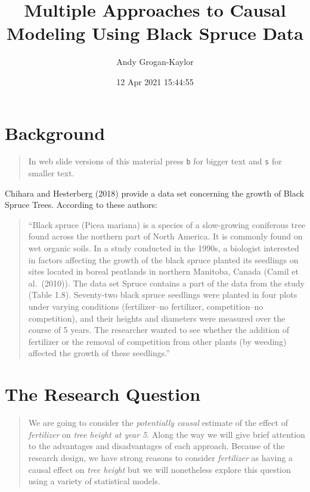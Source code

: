 \documentclass[
]{article}
\title{Multiple Approaches to Causal Modeling Using Black Spruce Data}
\author{Andy Grogan-Kaylor}
\date{12 Apr 2021 15:44:55}
\begin{document}
\maketitle

\hypertarget{background}{%
\section{Background 🌲}\label{background}}

\begin{quote}
In web slide versions of this material press \texttt{b} for bigger text
and \texttt{s} for smaller text.
\end{quote}

Chihara and Hesterberg (2018) provide a data set concerning the growth
of Black Spruce Trees. According to these authors:

\begin{quote}
``Black spruce (Picea mariana) is a species of a slow-growing coniferous
tree found across the northern part of North America. It is commonly
found on wet organic soils. In a study conducted in the 1990s, a
biologist interested in factors affecting the growth of the black spruce
planted its seedlings on sites located in boreal peatlands in northern
Manitoba, Canada (Camil et al.~(2010)). The data set Spruce contains a
part of the data from the study (Table 1.8). Seventy-two black spruce
seedlings were planted in four plots under varying conditions
(fertilizer--no fertilizer, competition--no competition), and their
heights and diameters were measured over the course of 5 years. The
researcher wanted to see whether the addition of fertilizer or the
removal of competition from other plants (by weeding) affected the
growth of these seedlings.''
\end{quote}

\hypertarget{the-research-question}{%
\section{The Research Question 🌲}\label{the-research-question}}

\begin{quote}
We are going to consider the \emph{potentially causal} estimate of the
effect of \emph{fertilizer} on \emph{tree height at year 5}. Along the
way we will give brief attention to the advantages and disadvantages of
each approach. Because of the research design, we have strong reasons to
consider \emph{fertilizer} as having a causal effect on \emph{tree
height} but we will nonetheless explore this question using a variety of
statistical models.
\end{quote}
\end{document}

